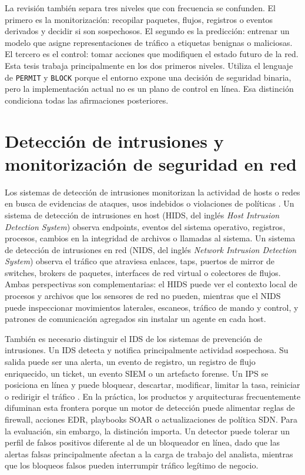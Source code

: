 La revisión también separa tres niveles que con frecuencia se confunden. El primero es la monitorización: recopilar paquetes, flujos, registros o eventos derivados y decidir si son sospechosos. El segundo es la predicción: entrenar un modelo que asigne representaciones de tráfico a etiquetas benignas o maliciosas. El tercero es el control: tomar acciones que modifiquen el estado futuro de la red. Esta tesis trabaja principalmente en los dos primeros niveles. Utiliza el lenguaje de \texttt{PERMIT} y \texttt{BLOCK} porque el entorno expone una decisión de seguridad binaria, pero la implementación actual no es un plano de control en línea. Esa distinción condiciona todas las afirmaciones posteriores.

\section{Detección de intrusiones y monitorización de seguridad en red}

Los sistemas de detección de intrusiones monitorizan la actividad de hosts o redes en busca de evidencias de ataques, usos indebidos o violaciones de políticas \parencite{ScarfoneMell2007}. Un sistema de detección de intrusiones en host (HIDS, del inglés \emph{Host Intrusion Detection System}) observa endpoints, eventos del sistema operativo, registros, procesos, cambios en la integridad de archivos o llamadas al sistema. Un sistema de detección de intrusiones en red (NIDS, del inglés \emph{Network Intrusion Detection System}) observa el tráfico que atraviesa enlaces, taps, puertos de mirror de switches, brokers de paquetes, interfaces de red virtual o colectores de flujos. Ambas perspectivas son complementarias: el HIDS puede ver el contexto local de procesos y archivos que los sensores de red no pueden, mientras que el NIDS puede inspeccionar movimientos laterales, escaneos, tráfico de mando y control, y patrones de comunicación agregados sin instalar un agente en cada host.

También es necesario distinguir el IDS de los sistemas de prevención de intrusiones. Un IDS detecta y notifica principalmente actividad sospechosa. Su salida puede ser una alerta, un evento de registro, un registro de flujo enriquecido, un ticket, un evento SIEM o un artefacto forense. Un IPS se posiciona en línea y puede bloquear, descartar, modificar, limitar la tasa, reiniciar o redirigir el tráfico \parencite{ScarfoneMell2007}. En la práctica, los productos y arquitecturas frecuentemente difuminan esta frontera porque un motor de detección puede alimentar reglas de firewall, acciones EDR, playbooks SOAR o actualizaciones de política SDN. Para la evaluación, sin embargo, la distinción importa. Un detector puede tolerar un perfil de falsos positivos diferente al de un bloqueador en línea, dado que las alertas falsas principalmente afectan a la carga de trabajo del analista, mientras que los bloqueos falsos pueden interrumpir tráfico legítimo de negocio.

